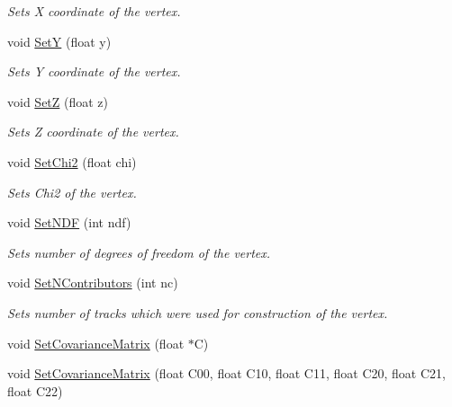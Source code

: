 \begin{DoxyCompactItemize}
\begin{DoxyCompactList}\small\item\em Sets X coordinate of the vertex. \end{DoxyCompactList}\item 
void \hyperlink{classKFPVertex_a34d56e65dd85b71fe87e6557d28eeef1}{SetY} (float y)\hypertarget{classKFPVertex_a34d56e65dd85b71fe87e6557d28eeef1}{}\label{classKFPVertex_a34d56e65dd85b71fe87e6557d28eeef1}

\begin{DoxyCompactList}\small\item\em Sets Y coordinate of the vertex. \end{DoxyCompactList}\item 
void \hyperlink{classKFPVertex_a65646df4853da48bd589bf2337f33f54}{SetZ} (float z)\hypertarget{classKFPVertex_a65646df4853da48bd589bf2337f33f54}{}\label{classKFPVertex_a65646df4853da48bd589bf2337f33f54}

\begin{DoxyCompactList}\small\item\em Sets Z coordinate of the vertex. \end{DoxyCompactList}\item 
void \hyperlink{classKFPVertex_a6e29b8eb79de8f15cfd06c55a5c986e5}{Set\+Chi2} (float chi)\hypertarget{classKFPVertex_a6e29b8eb79de8f15cfd06c55a5c986e5}{}\label{classKFPVertex_a6e29b8eb79de8f15cfd06c55a5c986e5}

\begin{DoxyCompactList}\small\item\em Sets Chi2 of the vertex. \end{DoxyCompactList}\item 
void \hyperlink{classKFPVertex_a9e2bb0acbfc334ed211e629b73949531}{Set\+N\+DF} (int ndf)\hypertarget{classKFPVertex_a9e2bb0acbfc334ed211e629b73949531}{}\label{classKFPVertex_a9e2bb0acbfc334ed211e629b73949531}

\begin{DoxyCompactList}\small\item\em Sets number of degrees of freedom of the vertex. \end{DoxyCompactList}\item 
void \hyperlink{classKFPVertex_ae2f6ae77d3b159a19466e78892787684}{Set\+N\+Contributors} (int nc)\hypertarget{classKFPVertex_ae2f6ae77d3b159a19466e78892787684}{}\label{classKFPVertex_ae2f6ae77d3b159a19466e78892787684}

\begin{DoxyCompactList}\small\item\em Sets number of tracks which were used for construction of the vertex. \end{DoxyCompactList}\item 
void \hyperlink{classKFPVertex_acf653f4e9125ff6cfc16f51de2385b0c}{Set\+Covariance\+Matrix} (float $\ast$C)
\item 
void \hyperlink{classKFPVertex_a6f8f798968e437398172fab4e6a6e46b}{Set\+Covariance\+Matrix} (float C00, float C10, float C11, float C20, float C21, float C22)
\end{DoxyCompactItemize}


